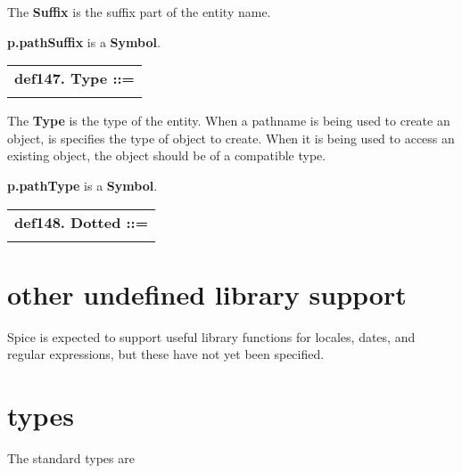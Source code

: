 \documentclass{report}
\begin{document}
The {\bf Suffix} is the suffix part of the entity name.

{\bf p.pathSuffix} is a {\bf Symbol}.

\begin{tabular}{l}
{\bf def147. Type ::= }\\ 
\hspace*{3mm}{\tt ";" Word} \\ 
\end{tabular}

The {\bf Type} is the type of the entity. When a pathname is being used to create
an object, is specifies the type of object to create. When it is being used
to access an existing object, the object should be of a compatible type.

{\bf p.pathType} is a {\bf Symbol}.

\begin{tabular}{l}
{\bf def148. Dotted ::= }\\ 
\hspace*{3mm}{\tt Word++ "."} \\ 
\end{tabular}

\section{other undefined library support}


Spice is expected to support useful library functions for locales, dates, and
regular expressions, but these have not yet been specified.\section{types}


The standard types are
\end{document}

